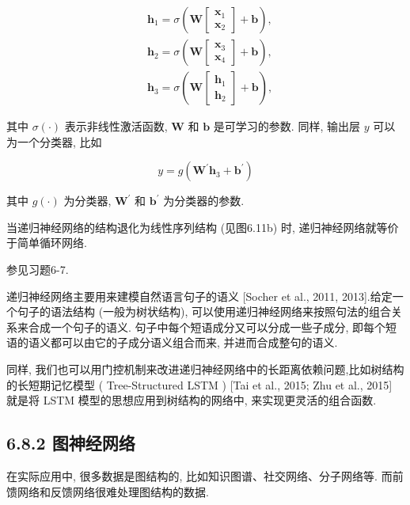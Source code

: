 \documentclass[10pt]{article}
\begin{document}
\begin{align*}
& \boldsymbol{h}_{1}=\sigma\left(\boldsymbol{W}\left[\begin{array}{l}
\boldsymbol{x}_{1} \\
\boldsymbol{x}_{2}
\end{array}\right]+\boldsymbol{b}\right),  \tag{6.75}\\
& \boldsymbol{h}_{2}=\sigma\left(\boldsymbol{W}\left[\begin{array}{l}
\boldsymbol{x}_{3} \\
\boldsymbol{x}_{4}
\end{array}\right]+\boldsymbol{b}\right),  \tag{6.76}\\
& \boldsymbol{h}_{3}=\sigma\left(\boldsymbol{W}\left[\begin{array}{l}
\boldsymbol{h}_{1} \\
\boldsymbol{h}_{2}
\end{array}\right]+\boldsymbol{b}\right), \tag{6.77}
\end{align*}


其中 $\sigma(\cdot)$ 表示非线性激活函数, $\boldsymbol{W}$ 和 $\boldsymbol{b}$ 是可学习的参数. 同样, 输出层 $y$ 可以为一个分类器, 比如


\begin{equation*}
y=g\left(\boldsymbol{W}^{\prime} \boldsymbol{h}_{3}+\boldsymbol{b}^{\prime}\right) \tag{6.78}
\end{equation*}


其中 $g(\cdot)$ 为分类器, $\boldsymbol{W}^{\prime}$ 和 $\boldsymbol{b}^{\prime}$ 为分类器的参数.

当递归神经网络的结构退化为线性序列结构 (见图6.11b) 时, 递归神经网络就等价于简单循环网络.

参见习题6-7.

递归神经网络主要用来建模自然语言句子的语义 [Socher et al., 2011, 2013].给定一个句子的语法结构 (一般为树状结构), 可以使用递归神经网络来按照句法的组合关系来合成一个句子的语义. 句子中每个短语成分又可以分成一些子成分, 即每个短语的语义都可以由它的子成分语义组合而来, 并进而合成整句的语义.

同样, 我们也可以用门控机制来改进递归神经网络中的长距离依赖问题,比如树结构的长短期记忆模型 ( Tree-Structured LSTM ) [Tai et al., 2015; Zhu et al., 2015] 就是将 LSTM 模型的思想应用到树结构的网络中, 来实现更灵活的组合函数.

\subsection*{6.8.2 图神经网络}
在实际应用中, 很多数据是图结构的, 比如知识图谱、社交网络、分子网络等. 而前馈网络和反馈网络很难处理图结构的数据.
\end{document}

